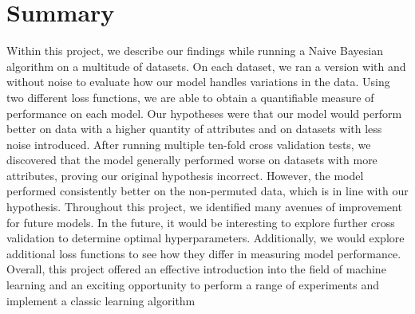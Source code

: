 \documentclass[twoside,11pt]{article}
\begin{document}
\section{Summary}
Within this project, we describe our findings while running a Naive Bayesian algorithm on a multitude of datasets. On each dataset, we ran a version with and without noise to evaluate how our model handles variations in the data. Using two different loss functions, we are able to obtain a quantifiable measure of performance on each model. Our hypotheses were that our model would perform better on data with a higher quantity of attributes and on datasets with less noise introduced. After running multiple ten-fold cross validation tests, we discovered that the model generally performed worse on datasets with more attributes, proving our original hypothesis incorrect. However, the model performed consistently better on the non-permuted data, which is in line with our hypothesis. Throughout this project, we identified many avenues of improvement for future models. In the future, it would be interesting to explore further cross validation to determine optimal hyperparameters. Additionally, we would explore additional loss functions to see how they differ in measuring model performance. Overall, this project offered an effective introduction into the field of machine learning and an exciting opportunity to perform a range of experiments and implement a classic learning algorithm

\vskip 0.2in
\end{document}
